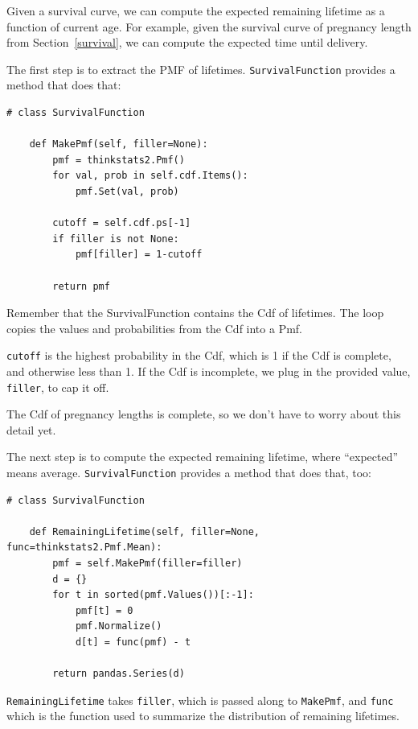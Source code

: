 \documentclass[12pt]{book}
\begin{document}
Given a survival curve, we can compute the expected remaining
lifetime as a function of current age.  For example, given the
survival curve of pregnancy length from Section~\ref{survival},
we can compute the expected time until delivery.

The first step is to extract the PMF of lifetimes.  \verb"SurvivalFunction"
provides a method that does that:

\begin{verbatim}
# class SurvivalFunction

    def MakePmf(self, filler=None):
        pmf = thinkstats2.Pmf()
        for val, prob in self.cdf.Items():
            pmf.Set(val, prob)

        cutoff = self.cdf.ps[-1]
        if filler is not None:
            pmf[filler] = 1-cutoff

        return pmf
\end{verbatim}

Remember that the SurvivalFunction contains the Cdf of lifetimes.
The loop copies the values and probabilities from the Cdf into
a Pmf.

\verb"cutoff" is the highest probability in the Cdf, which is 1
if the Cdf is complete, and otherwise less than 1.  
If the Cdf is incomplete, we plug in the provided value, \verb"filler",
to cap it off.

The Cdf of pregnancy lengths is complete, so we don't have to worry
about this detail yet.

The next step is to compute the expected remaining lifetime, where
``expected'' means average.  \verb"SurvivalFunction"
provides a method that does that, too:

\begin{verbatim}
# class SurvivalFunction

    def RemainingLifetime(self, filler=None, func=thinkstats2.Pmf.Mean):
        pmf = self.MakePmf(filler=filler)
        d = {}
        for t in sorted(pmf.Values())[:-1]:
            pmf[t] = 0
            pmf.Normalize()
            d[t] = func(pmf) - t

        return pandas.Series(d)
\end{verbatim}

\verb"RemainingLifetime" takes \verb"filler", which is passed along
to \verb"MakePmf", and \verb"func" which is the function used to
summarize the distribution of remaining lifetimes.
\end{document}
